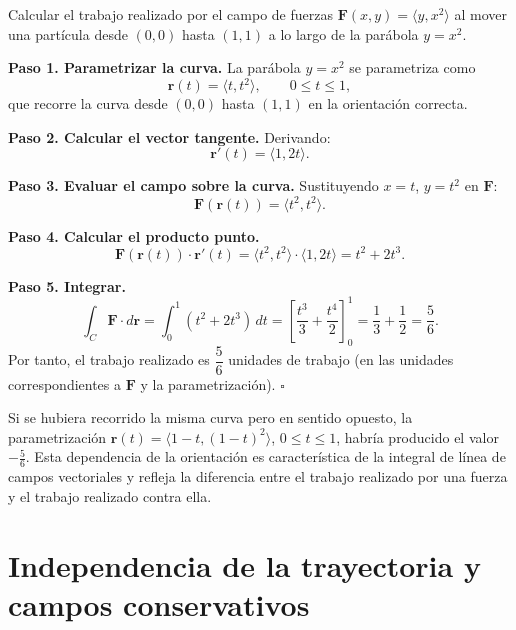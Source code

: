 \begin{example}
Calcular el trabajo realizado por el campo de fuerzas
$\mathbf{F}(x,y) = \langle y, x^2 \rangle$ al mover una partícula desde
$(0,0)$ hasta $(1,1)$ a lo largo de la parábola $y=x^2$.
\end{example}

\begin{myproof}
\textbf{Paso 1. Parametrizar la curva.}
La parábola $y=x^2$ se parametriza como
\[
\mathbf{r}(t) = \langle t, t^2 \rangle, \qquad 0 \le t \le 1,
\]
que recorre la curva desde $(0,0)$ hasta $(1,1)$ en la orientación
correcta.

\textbf{Paso 2. Calcular el vector tangente.}
Derivando:
\[
\mathbf{r}'(t) = \langle 1, 2t \rangle.
\]

\textbf{Paso 3. Evaluar el campo sobre la curva.}
Sustituyendo $x=t$, $y=t^2$ en $\mathbf{F}$:
\[
\mathbf{F}(\mathbf{r}(t)) = \langle t^2, t^2 \rangle.
\]

\textbf{Paso 4. Calcular el producto punto.}
\[
\mathbf{F}(\mathbf{r}(t)) \cdot \mathbf{r}'(t)
= \langle t^2, t^2 \rangle \cdot \langle 1, 2t \rangle
= t^2 + 2t^3.
\]

\textbf{Paso 5. Integrar.}
\[
\int_C \mathbf{F} \cdot d\mathbf{r}
= \int_0^1 (t^2 + 2t^3) \, dt
= \left[ \frac{t^3}{3} + \frac{t^4}{2} \right]_0^1
= \frac{1}{3} + \frac{1}{2} = \frac{5}{6}.
\]
Por tanto, el trabajo realizado es $\boxed{\dfrac{5}{6}}$ unidades de
trabajo (en las unidades correspondientes a $\mathbf{F}$ y la
parametrización). $\square$
\end{myproof}

\begin{rem}
Si se hubiera recorrido la misma curva pero en sentido opuesto, la
parametrización $\mathbf{r}(t)=\langle 1-t, (1-t)^2 \rangle$,
$0\le t\le 1$, habría producido el valor $-\frac{5}{6}$. Esta
dependencia de la orientación es característica de la integral de línea
de campos vectoriales y refleja la diferencia entre el trabajo realizado
por una fuerza y el trabajo realizado contra ella.
\end{rem}

\section{Independencia de la trayectoria y campos conservativos}

